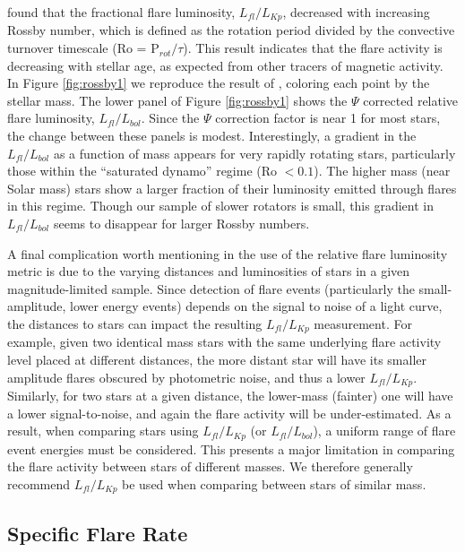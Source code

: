 \documentclass[preprint2]{aastex62}
\begin{document}
\citet{davenport2016} found that the fractional flare luminosity, $L_{fl}/L_{Kp}$, decreased with increasing Rossby number, which is defined as the rotation period divided by the convective turnover timescale (Ro = P$_{rot} / \tau$). This result indicates that the flare activity is decreasing with stellar age, as expected from other tracers of magnetic activity. In Figure \ref{fig:rossby1} we reproduce the result of \citet{davenport2016}, coloring each point by the stellar mass. The lower panel of Figure \ref{fig:rossby1} shows the $\Psi$ corrected relative flare luminosity, $L_{fl}/L_{bol}$. Since the $\Psi$ correction factor is near 1 for most stars, the change between these panels is modest. Interestingly, a gradient in the $L_{fl}/L_{bol}$ as a function of mass appears for very rapidly rotating stars, particularly those within the ``saturated dynamo'' regime (Ro $< 0.1$). The higher mass (near Solar mass) stars show a larger fraction of their luminosity emitted through flares in this regime. Though our sample of slower rotators is small, this gradient in $L_{fl}/L_{bol}$ seems to disappear for larger Rossby numbers. 

A final complication worth mentioning in the use of the relative flare luminosity metric is due to the varying distances and luminosities of stars in a given magnitude-limited sample. Since detection of flare events (particularly the small-amplitude, lower energy events) depends on the signal to noise of a light curve, the distances to stars can impact the resulting $L_{fl}/L_{Kp}$ measurement. For example, given two identical mass stars with the same underlying flare activity level placed at different distances, the more distant star will have its smaller amplitude flares obscured by photometric noise, and thus a lower $L_{fl}/L_{Kp}$. Similarly, for two stars at a given distance, the lower-mass (fainter) one will have a lower signal-to-noise, and again the flare activity will be under-estimated. As a result, when comparing stars using $L_{fl}/L_{Kp}$ (or $L_{fl}/L_{bol}$), a uniform range of flare event energies must be considered. This presents a major limitation in comparing the flare activity between stars of different masses. We therefore generally recommend $L_{fl}/L_{Kp}$ be used when comparing between stars of similar mass.




\subsection{Specific Flare Rate}
\label{sec:rate}
\end{document}
